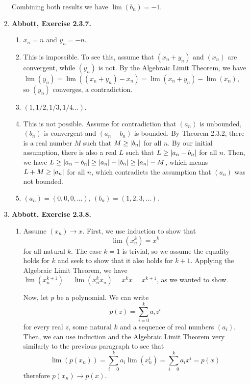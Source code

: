 \documentclass{article}
\DeclarePairedDelimiter\abs{\lvert}{\rvert}
\newcommand{\exc}[2][Abbott]{\item \textbf{#1, Exercise #2.}}
\begin{document}
\begin{enumerate}
	Combining both results we have $\lim(b_n) = -1$.
			        
	\exc{2.3.7}
	\begin{enumerate}
		\item $x_n = n$ and $y_n = -n$.
		      		      		                  
		\item This is impossible. To see this, assume that $(x_n+y_n)$ and $(x_n)$ are convergent, while $(y_n)$ is not. By the Algebraic Limit Theorem, we have $\lim(y_n)=\lim((x_n+y_n)-x_n) = \lim(x_n+y_n)-\lim(x_n)$, so $(y_n)$ converges, a contradiction.
		      		      		                  
		\item $(1, 1/2, 1/3, 1/4 \dots)$.
		      		      		                  
		\item This is not possible. Assume for contradiction that $(a_n)$ is unbounded, $(b_n)$ is convergent and $(a_n-b_n)$ is bounded. By Theorem 2.3.2, there is a real number $M$ such that $M \geq \abs*{b_n}$ for all $n$. By our initial assumption, there is also a real $L$ such that $L \geq \abs*{a_n-b_n}$ for all $n$. Then, we have $L \geq \abs*{a_n-b_n} \geq \abs*{a_n} - \abs*{b_n} \geq \abs*{a_n} - M$, which means $L+M \geq \abs*{a_n}$ for all $n$, which contradicts the assumption that $(a_n)$ was not bounded.
		      		      		                  
		\item $(a_n) = (0,0,0, \dots)$, $(b_n) = (1,2,3, \dots)$.
	\end{enumerate}
			        
	\exc{2.3.8}
			    
	\begin{enumerate}
		\item Assume $(x_n) \rightarrow x$. First, we use induction to show that \begin{equation*}
		      \lim (x_n^k) = x ^ k
		\end{equation*}
		for all natural $k$. The case $k = 1$ is trivial, so we assume the equality holds for $k$ and seek to show that it also holds for $k+1$. Applying the Algebraic Limit Theorem, we have $\lim(x_n^{k+1}) = \lim(x_n^k x_n) = x^k x = x^{k+1}$, as we wanted to show.
						            
		Now, let $p$ be a polynomial. We can write \begin{equation*}
		p(z) = \sum\limits_{i=0}^k a_i z^i
		\end{equation*}
		for every real $z$, some natural $k$ and a sequence of real numbers $(a_i)$. Then, we can use induction and the Algebraic Limit Theorem very similarly to the previous paragraph to see that \begin{equation*}
		\lim (p(x_n)) = \sum\limits_{i=0}^k a_i \lim(x_n^i) =\sum\limits_{i=0}^k a_i x^i = p(x)
		\end{equation*}
		therefore $p(x_n) \rightarrow p(x)$.
						            

\end{enumerate}
\end{enumerate}
\end{document}
